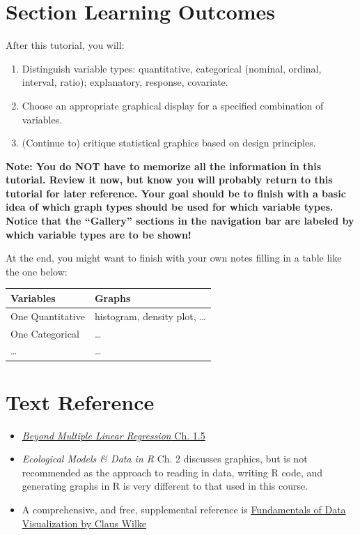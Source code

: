 \documentclass[
  letterpaper,
  DIV=11,
  numbers=noendperiod]{scrreprt}
\providecommand{\tightlist}{%
  \setlength{\itemsep}{0pt}\setlength{\parskip}{0pt}}\usepackage{longtable,booktabs,array}
\theoremstyle{remark}
\begin{document}
\section*{Section Learning Outcomes}\label{section-learning-outcomes-1}


After this tutorial, you will:

\begin{enumerate}
\def\labelenumi{\arabic{enumi}.}
\tightlist
\item
  Distinguish variable types: quantitative, categorical (nominal,
  ordinal, interval, ratio); explanatory, response, covariate.
\item
  Choose an appropriate graphical display for a specified combination of
  variables.
\item
  (Continue to) critique statistical graphics based on design
  principles.
\end{enumerate}

\textbf{Note: You do NOT have to memorize all the information in this
tutorial. Review it now, but know you will probably return to this
tutorial for later reference. Your goal should be to finish with a basic
idea of which graph types should be used for which variable types.
Notice that the ``Gallery'' sections in the navigation bar are labeled
by which variable types are to be shown!}

At the end, you might want to finish with your own notes filling in a
table like the one below:

\begin{longtable}[]{@{}ll@{}}
\toprule\noalign{}
Variables & Graphs \\
\midrule\noalign{}
\endhead
\bottomrule\noalign{}
\endlastfoot
One Quantitative & histogram, density plot, \ldots{} \\
One Categorical & \ldots{} \\
\ldots{} & \ldots{} \\
\end{longtable}

\section*{Text Reference}\label{text-reference}


\begin{itemize}
\tightlist
\item
  \href{https://bookdown.org/roback/bookdown-BeyondMLR/ch-MLRreview.html\#explorech1}{\emph{Beyond
  Multiple Linear Regression} Ch. 1.5}
\item
  \emph{Ecological Models \& Data in R} Ch. 2 discusses graphics, but is
  not recommended as the approach to reading in data, writing R code,
  and generating graphs in R is very different to that used in this
  course.
\item
  A comprehensive, and free, supplemental reference is
  \href{https://clauswilke.com/dataviz/}{Fundamentals of Data
  Visualization by Claus Wilke}
\end{itemize}
\end{document}

